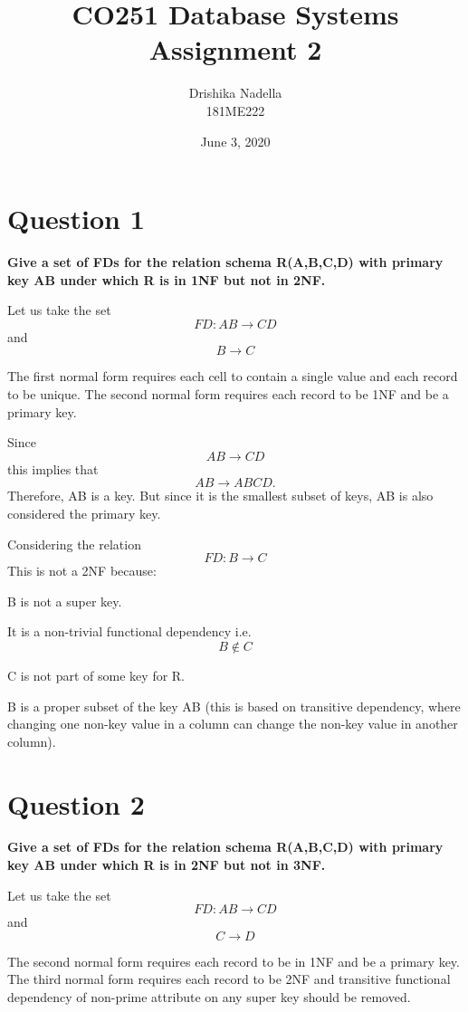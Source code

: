 \documentclass[12pt]{article}
\title{CO251 Database Systems Assignment 2} %
\author{Drishika Nadella\\ %
\textsc{181ME222}
}
\date{June 3, 2020} %
\begin{document}
\setlength{\droptitle}{-5em}    
\maketitle


\section*{Question 1}
{\bfseries Give a set of FDs for the relation schema R(A,B,C,D) with primary key AB under which R is in 1NF but not in 2NF.}

Let us take the set \[FD: AB \rightarrow CD\]and \[B \rightarrow C\]

The first normal form requires each cell to contain a single value and each record to be unique. The second normal form requires each record to be 1NF and be a primary key.

Since \[AB \rightarrow CD\] this implies that \[AB \rightarrow ABCD.\]
Therefore, AB is a key. But since it is the smallest subset of keys, AB is also considered the primary key. 

Considering the relation \[FD: B \rightarrow C\] This is not a 2NF because:

B is not a super key.

It is a non-trivial functional dependency i.e. \[B\not\in C\]

C is not part of some key for R.

B is a proper subset of the key AB (this is based on transitive dependency, where changing one non-key value in a column can change the non-key value in another column).

\section*{Question 2}
{\bfseries Give a set of FDs for the relation schema R(A,B,C,D) with primary key AB under which R is in 2NF but not in 3NF.}

Let us take the set \[FD: AB \rightarrow CD\] and \[C \rightarrow D\] 

The second normal form requires each record to be in 1NF and be a primary key. The third normal form requires each record to be 2NF and transitive functional dependency of non-prime attribute on any super key should be removed.
\end{document}
